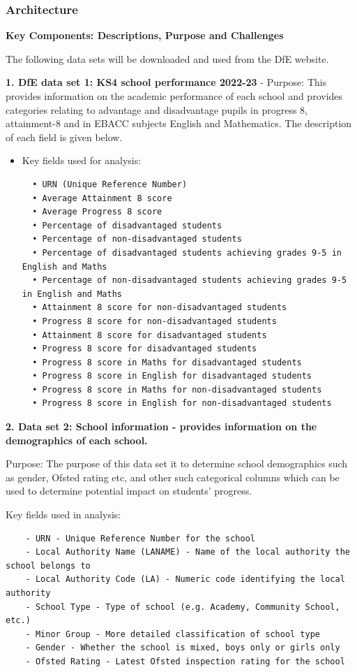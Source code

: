 \documentclass[
  letterpaper,
  DIV=11,
  numbers=noendperiod]{scrartcl}
\begin{document}
\subsubsection{Architecture}\label{architecture}

\textbf{Key Components: Descriptions, Purpose and Challenges}

The following data sets will be downloaded and used from the DfE
website.

\textbf{1. DfE data set 1: KS4 school performance 2022-23} - Purpose:
This provides information on the academic performance of each school and
provides categories relating to advantage and disadvantage pupils in
progress 8, attainment-8 and in EBACC subjects English and Mathematics.
The description of each field is given below.

\begin{itemize}
\item
  Key fields used for analysis:

\begin{verbatim}
  • URN (Unique Reference Number)
  • Average Attainment 8 score
  • Average Progress 8 score 
  • Percentage of disadvantaged students
  • Percentage of non-disadvantaged students
  • Percentage of disadvantaged students achieving grades 9-5 in English and Maths
  • Percentage of non-disadvantaged students achieving grades 9-5 in English and Maths
  • Attainment 8 score for non-disadvantaged students
  • Progress 8 score for non-disadvantaged students
  • Attainment 8 score for disadvantaged students
  • Progress 8 score for disadvantaged students
  • Progress 8 score in Maths for disadvantaged students
  • Progress 8 score in English for disadvantaged students
  • Progress 8 score in Maths for non-disadvantaged students
  • Progress 8 score in English for non-disadvantaged students
\end{verbatim}
\end{itemize}

\textbf{2. Data set 2: School information - provides information on the
demographics of each school.}

Purpose: The purpose of this data set it to determine school
demographics such as gender, Ofsted rating etc, and other such
categorical columns which can be used to determine potential impact on
students' progress.

Key fields used in analysis:

\begin{verbatim}
    - URN - Unique Reference Number for the school
    - Local Authority Name (LANAME) - Name of the local authority the school belongs to
    - Local Authority Code (LA) - Numeric code identifying the local authority
    - School Type - Type of school (e.g. Academy, Community School, etc.)
    - Minor Group - More detailed classification of school type
    - Gender - Whether the school is mixed, boys only or girls only
    - Ofsted Rating - Latest Ofsted inspection rating for the school
\end{verbatim}
\end{document}
